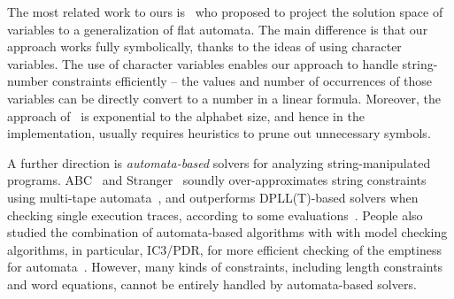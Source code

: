 \documentclass[sigplan,review,anonymous]{acmart}\settopmatter{printfolios=true,printccs=false,printacmref=false}
\begin{document}
The most related work to ours is~\cite{abdulla2018trau} who proposed to project the solution space of variables to a generalization of flat automata. The main difference is that our approach works fully symbolically, thanks to the ideas of using character variables. The use of character variables enables our approach to handle string-number constraints efficiently -- the values and number of occurrences of those variables can be directly convert to a number in a linear formula. Moreover, the approach of~\cite{abdulla2018trau} is exponential to the alphabet size, and hence in the implementation, usually requires heuristics to prune out unnecessary symbols. 

A further direction is {\it automata-based} solvers for analyzing
string-manipulated programs. ABC~\cite{aydin2018parameterized} and Stranger~\cite{yu2010stranger} soundly over-approximates string constraints using multi-tape automata~\cite{yu2016optimal}, and outperforms DPLL(T)-based solvers when checking single execution traces, according to some evaluations~\cite{kausler2014evaluation}. People also studied the combination of automata-based algorithms with with model checking
algorithms, in particular, IC3/PDR, for more efficient checking of the emptiness for automata~\cite{wang2016string,sloth}. However, many kinds of constraints, including length constraints and word equations, cannot be entirely handled by automata-based solvers. 







\end{document}
